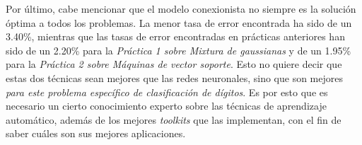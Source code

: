 \documentclass[a4paper]{article}
\begin{document}
\quad Por último, cabe mencionar que el modelo conexionista no siempre es la solución óptima a todos los problemas. La menor tasa de error encontrada ha sido de un 3.40\%, mientras que las tasas de error encontradas en prácticas anteriores han sido de un 2.20\% para la \textit{Práctica 1 sobre Mixtura de gaussianas} y de un 1.95\% para la \textit{Práctica 2 sobre Máquinas de vector soporte}. Esto no quiere decir que estas dos técnicas sean mejores que las redes neuronales, sino que son mejores \textit{para este problema específico de clasificación de dígitos}. Es por esto que es necesario un cierto conocimiento experto sobre las técnicas de aprendizaje automático, además de los mejores \textit{toolkits} que las implementan, con el fin de saber cuáles son sus mejores aplicaciones.
\end{document}
